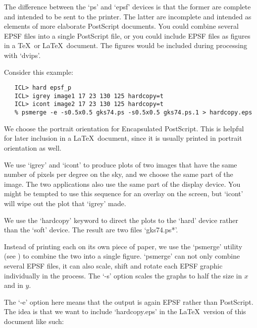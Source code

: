    The difference between the `ps' and `epsf' devices is that the former
   are complete and intended to be sent to the printer. The latter are
   incomplete and intended as elements of more elaborate PostScript
   documents. You could combine several EPSF files into a single
   PostScript file, or you could include EPSF files as figures in a
   \TeX\ or \LaTeX\ document. The figures would be included during
   processing with `dvips'.

   Consider this example:

\begin{verbatim}
   ICL> hard epsf_p
   ICL> igrey image1 17 23 130 125 hardcopy=t
   ICL> icont image2 17 23 130 125 hardcopy=t
   % psmerge -e -s0.5x0.5 gks74.ps -s0.5x0.5 gks74.ps.1 > hardcopy.eps
\end{verbatim}

\begin{figure}[htb]
\begin{center}
\leavevmode{}
\end{center}
\end{figure}

   We choose the portrait orientation for Encapsulated PostScript. This
   is helpful for later inclusion in a \LaTeX\ document, since it is
   usually printed in portrait orientation as well.

   We use `igrey' and `icont' to produce plots of two images that have
   the same number of pixels per degree on the sky, and we choose the
   same part of the image. The two applications also use the same part
   of the display device. You might be tempted to use this sequence for
   an overlay on the screen, but `icont' will wipe out the plot that
   `igrey' made.

   We use the `hardcopy' keyword to direct the plots to the `hard'
   device rather than the `soft' device. The result are two files
   `gks74.ps*'.

   Instead of printing each on its own piece of paper, we use the
   `psmerge' utility (see ) to combine the two
   into a single figure.  `psmerge' can not only combine several EPSF
   files, it can also scale, shift and rotate each EPSF graphic
   individually in the process. The `-s' option scales the graphs to half
   the size in $x$\/ and in $y$.

   The `-e' option here means that the output is again EPSF rather than
   PostScript. The idea is that we want to include `hardcopy.eps' in the
   \LaTeX\ version of this document like such:

